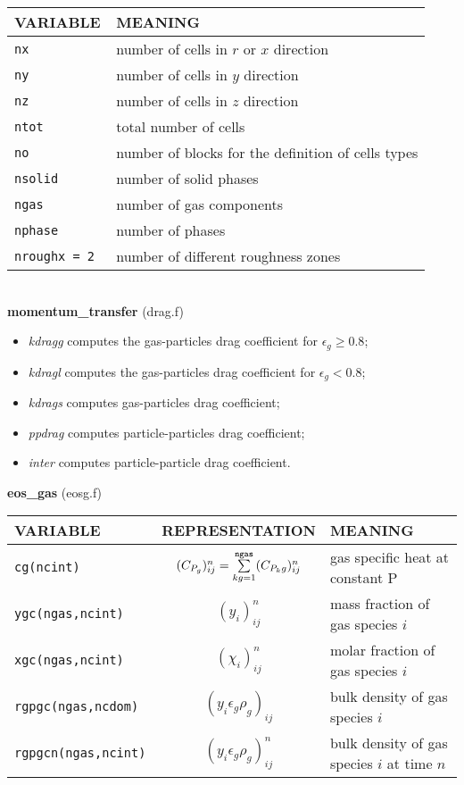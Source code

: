 \begin{tabular}{|p{6cm}|p{6cm}|}\hline
VARIABLE & MEANING\\\hline
\tt  nx    & number of cells in $r$ or $x$ direction\\\hline
\tt  ny    & number of cells in $y$ direction\\\hline
\tt  nz    & number of cells in $z$ direction\\\hline
\tt  ntot  & total number of cells \\\hline
\tt  no   & number of blocks for the definition of cells types\\\hline
\tt  nsolid    & number of solid phases\\\hline
\tt  ngas   & number of gas components\\\hline
\tt  nphase & number of phases\\\hline
\tt  nroughx = 2 & number of different roughness zones\\\hline
\end{tabular}\\[5mm]
%
%
{\large{\bf momentum\_transfer}} (drag.f)\\
\begin{itemize}
\item{\em kdragg} computes the gas-particles drag coefficient for $\epsilon_g \geq 0.8$;
\item{\em kdragl} computes the gas-particles drag coefficient for $\epsilon_g < 0.8$;
\item{\em kdrags} computes gas-particles drag coefficient;
\item{\em ppdrag} computes particle-particles drag coefficient;
\item{\em inter} computes particle-particle drag coefficient.
\end{itemize}
%
%
{\large {\bf eos\_gas}} (eosg.f)\\[5mm]
\begin{tabular}{|p{6cm}|c|p{6cm}|}\hline
VARIABLE & REPRESENTATION & MEANING\\\hline
\tt cg(ncint)          & $(C_{P_g})_{ij}^n=\sum\limits_{kg=1}^{\tt ngas}(C_{P_kg})_{ij}^n$ &  gas specific heat at constant P\\\hline
\tt ygc(ngas,ncint)    & $(y_i)_{ij}^n$&  mass fraction of gas species $i$\\ \hline
\tt xgc(ngas,ncint)    & $(\chi_i)_{ij}^n$&  molar fraction of gas species $i$\\ \hline
\tt rgpgc(ngas,ncdom)  & $(y_{i}\epsilon_g\rho_g)_{ij}$& bulk density of gas species $i$ \\ \hline
\tt rgpgcn(ngas,ncint) & $(y_{i}\epsilon_g\rho_g)_{ij}^{n}$& bulk density of gas species $i$ at time $n$ \\ \hline
\end{tabular}\\

